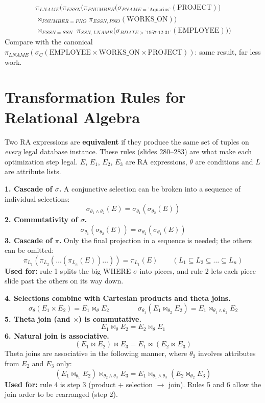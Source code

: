 \documentclass[10pt,a4paper]{article}
\newcommand{\R}[1]{\mathrm{#1}}
\newcommand{\aq}{\text{'Aquarius'}}
\newcommand{\bd}{\text{'1957-12-31'}}
\begin{document}
\medskip
\begin{exbox}
\begin{multline*}
\pi_{LNAME}\bigg(\pi_{ESSN}\Big(\pi_{PNUMBER}\big(\sigma_{PNAME=\aq}(\R{PROJECT})\big)\\
\bowtie_{PNUMBER=PNO} \pi_{ESSN,PNO}(\R{WORKS\_ON})\Big)\\
\bowtie_{ESSN=SSN}\ \pi_{SSN,LNAME}\big(\sigma_{BDATE>\bd}(\R{EMPLOYEE})\big)\bigg)
\end{multline*}
Compare with the canonical $\pi_{LNAME}(\sigma_C(\R{EMPLOYEE} \times \R{WORKS\_ON} \times \R{PROJECT}))$: same result, far less work.
\end{exbox}

\section{Transformation Rules for Relational Algebra}\label{sec:rules}

Two RA expressions are \textbf{equivalent} if they produce the same set of tuples on \emph{every} legal database instance. These rules (slides 280--283) are what make each optimization step legal. $E$, $E_1$, $E_2$, $E_3$ are RA expressions, $\theta$ are conditions and $L$ are attribute lists.

\begin{keybox}
\textbf{1. Cascade of $\sigma$.} A conjunctive selection can be broken into a sequence of individual selections:
\[ \sigma_{\theta_1 \wedge \theta_2}(E) = \sigma_{\theta_1}(\sigma_{\theta_2}(E)) \]
\textbf{2. Commutativity of $\sigma$.}
\[ \sigma_{\theta_1}(\sigma_{\theta_2}(E)) = \sigma_{\theta_2}(\sigma_{\theta_1}(E)) \]
\textbf{3. Cascade of $\pi$.} Only the final projection in a sequence is needed; the others can be omitted:
\[ \pi_{L_1}(\pi_{L_2}(\dots(\pi_{L_n}(E))\dots)) = \pi_{L_1}(E) \qquad (L_1 \subseteq L_2 \subseteq \dots \subseteq L_n) \]
\textbf{Used for:} rule 1 splits the big WHERE $\sigma$ into pieces, and rule 2 lets each piece slide past the others on its way down.
\end{keybox}

\begin{keybox}
\textbf{4. Selections combine with Cartesian products and theta joins.}
\[ \sigma_{\theta}(E_1 \times E_2) = E_1 \bowtie_{\theta} E_2 \qquad\qquad \sigma_{\theta_1}(E_1 \bowtie_{\theta_2} E_2) = E_1 \bowtie_{\theta_1 \wedge \theta_2} E_2 \]
\textbf{5. Theta join (and $\times$) is commutative.}
\[ E_1 \bowtie_{\theta} E_2 = E_2 \bowtie_{\theta} E_1 \]
\textbf{6. Natural join is associative.}
\[ (E_1 \bowtie E_2) \bowtie E_3 = E_1 \bowtie (E_2 \bowtie E_3) \]
Theta joins are associative in the following manner, where $\theta_2$ involves attributes from $E_2$ and $E_3$ only:
\[ (E_1 \bowtie_{\theta_1} E_2) \bowtie_{\theta_2 \wedge \theta_3} E_3 = E_1 \bowtie_{\theta_1 \wedge \theta_3} (E_2 \bowtie_{\theta_2} E_3) \]
\textbf{Used for:} rule 4 is step 3 (product + selection $\to$ join). Rules 5 and 6 allow the join order to be rearranged (step 2).
\end{keybox}
\end{document}
